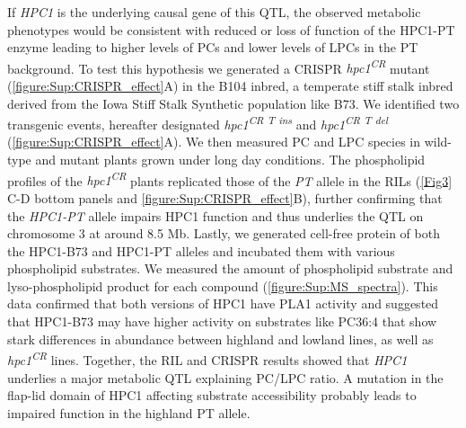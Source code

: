 \documentclass[9pt,twocolumn,twoside,lineno]{biorxiv}
\newcommand{\hpc}{\textit{HPC1}\xspace}
\begin{document}
If \hpc is the underlying causal gene of this QTL, the observed metabolic phenotypes would be consistent with reduced or loss of function of the HPC1-PT enzyme leading to higher levels of PCs and lower levels of LPCs in the PT background. 
To test this hypothesis we generated a CRISPR \textit{hpc1\textsuperscript{CR}} mutant (\cref{figure:Sup:CRISPR_effect}A) in the B104 inbred, a temperate stiff stalk inbred derived from the Iowa Stiff Stalk Synthetic population like B73. 
We identified two transgenic events, hereafter designated \textit{hpc1\textsuperscript{CR T ins}} and \textit{hpc1\textsuperscript{CR T del}} (\cref{figure:Sup:CRISPR_effect}A).
We then measured PC and LPC species in wild-type and mutant plants grown under long day conditions.  
The phospholipid profiles of the \textit{hpc1\textsuperscript{CR}} plants 
replicated those of the \textit{PT} allele in the RILs (\cref{Fig3} C-D bottom panels and \cref{figure:Sup:CRISPR_effect}B), further confirming that the \textit{HPC1-PT} allele impairs HPC1 function and thus underlies the QTL on chromosome 3 at around 8.5 Mb. 
Lastly, we generated cell-free protein of both the HPC1-B73 and HPC1-PT alleles and incubated them with various phospholipid substrates. 
We measured the amount of phospholipid substrate and lyso-phospholipid product for each compound (\cref{figure:Sup:MS_spectra}). 
This data confirmed that both versions of HPC1 have PLA1 activity and suggested that HPC1-B73 may have higher activity on substrates like PC36:4 that show stark differences in abundance between highland and lowland lines, as well as \textit{hpc1\textsuperscript{CR}} lines.
Together, the RIL and CRISPR results showed that \hpc underlies a major metabolic QTL explaining PC/LPC ratio. 
A mutation in the flap-lid domain of HPC1 affecting substrate accessibility probably leads to impaired function in the highland PT allele.
\end{document}
